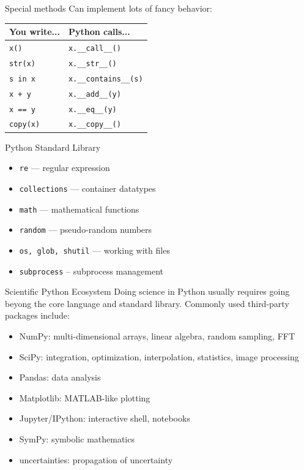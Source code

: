 \documentclass[noamssymb,svgnames]{beamer}
\newcommand{\obj}[1]{\texttt{\color{darkblue}#1}}
\begin{document}
\begin{frame}{Special methods}
  Can implement lots of fancy behavior:
  \begin{table}
    \centering
    \begin{tabular}{ll}
      \toprule
      You write... & Python calls... \\
      \midrule
      \obj{x()} & \obj{x.\_\_call\_\_()} \\
      \obj{str(x)} & \obj{x.\_\_str\_\_()} \\
      \obj{s in x} & \obj{x.\_\_contains\_\_(s)} \\
      \obj{x + y} & \obj{x.\_\_add\_\_(y)} \\
      \obj{x == y} & \obj{x.\_\_eq\_\_(y)} \\
      \obj{copy(x)} & \obj{x.\_\_copy\_\_()} \\
      \bottomrule
    \end{tabular}
  \end{table}
\end{frame}

\begin{frame}{Python Standard Library}
  \begin{itemize}
  \item \obj{re} --- regular expression
  \item \obj{collections} --- container datatypes
  \item \obj{math} --- mathematical functions
  \item \obj{random} --- pseudo-random numbers
  \item \obj{os, glob, shutil} --- working with files
  \item \obj{subprocess} -- subprocess management
  \end{itemize}
\end{frame}

\begin{frame}{Scientific Python Ecosystem}
  Doing science in Python usually requires going beyong the core language and
  standard library. Commonly used third-party packages include:
  \begin{itemize}
  \item NumPy: multi-dimensional arrays, linear algebra, random sampling, FFT
  \item SciPy: integration, optimization, interpolation, statistics, image
    processing
  \item Pandas: data analysis
  \item Matplotlib: MATLAB-like plotting
  \item Jupyter/IPython: interactive shell, notebooks
  \item SymPy: symbolic mathematics
  \item uncertainties: propagation of uncertainty
  \end{itemize}
\end{frame}
\end{document}
